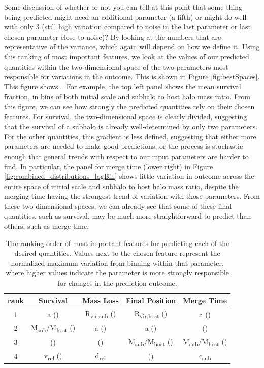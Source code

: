 \documentclass[fleqn,usenatbib]{mnras}
\newcommand\edits[1]{{\color{red}#1}}
\begin{document}
\edits{Some discussion of whether or not you can tell at this point that some thing being predicted might need an additional parameter (a fifth) or might do well with only 3 (still high variation compared to noise in the last parameter or last chosen parameter close to noise)? By looking at the numbers that are representative of the variance, which again will depend on how we define it.} Using this ranking of most important features, we look at the values of our predicted quantities within the two-dimensional space of the two parameters most responsible for variations in the outcome. This is shown in Figure \ref{fig:bestSpaces}. \edits{This figure shows... For example, the top left panel shows the mean survival fraction, in bins of both initial scale and subhalo to host halo mass ratio.} From this figure, we can see how strongly the predicted quantities rely on their chosen features. For survival, the two-dimensional space is clearly divided, suggesting that the survival of a subhalo is already well-determined by only two parameters. For the other quantities, this gradient is less defined, suggesting that either more parameters are needed to make good predictions, or the process is stochastic enough that general trends with respect to our input parameters are harder to find. In particular, the panel for merge time (lower right) in Figure \ref{fig:combined_distributions_logBin} shows little variation in outcome across the entire space of initial scale and subhalo to host halo mass ratio, despite the merging time having the strongest trend of variation with those parameters. From these two-dimensional spaces, we can already see that some of these final quantities, such as survival, may be much more straightforward to predict than others, such as merge time.

\begin{table}
	\centering
	\caption{The ranking order of most important features for predicting each of the desired quantities. Values next to the chosen feature represent the normalized maximum variation from binning within that parameter, where higher values indicate the parameter is more strongly responsible for changes in the prediction outcome.}
	\label{tab:FS_table}
	\begin{tabular}{c|cccc} %
		\hline
		rank & Survival & Mass Loss & Final Position & Merge Time\\
		\hline
		1 & a () & R\textsubscript{vir,sub} () & R\textsubscript{vir,host} () & a ()\\
		2 & M\textsubscript{sub}/M\textsubscript{host} () & a () & a () & \textepsilon ()\\
		3 & \textepsilon () & \textepsilon () & M\textsubscript{sub}/M\textsubscript{host} () & M\textsubscript{sub}/M\textsubscript{host} ()\\
		4 & v\textsubscript{rel} () & d\textsubscript{rel} & \textepsilon () & c\textsubscript{sub}\\
		\hline
	\end{tabular}
\end{table}
\end{document}

